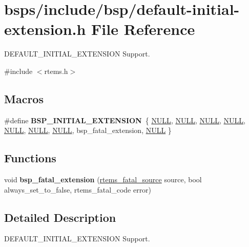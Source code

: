 \hypertarget{default-initial-extension_8h}{}\section{bsps/include/bsp/default-\/initial-\/extension.h File Reference}
\label{default-initial-extension_8h}


D\+E\+F\+A\+U\+L\+T\+\_\+\+I\+N\+I\+T\+I\+A\+L\+\_\+\+E\+X\+T\+E\+N\+S\+I\+ON Support.  


{\ttfamily \#include $<$rtems.\+h$>$}\newline
\subsection*{Macros}
\begin{DoxyCompactItemize}
\item 
\mbox{\label{default-initial-extension_8h_a56bfae5880e466e14ca27beaafc41443}} 
\#define {\bfseries B\+S\+P\+\_\+\+I\+N\+I\+T\+I\+A\+L\+\_\+\+E\+X\+T\+E\+N\+S\+I\+ON}~\{ \mbox{\hyperlink{bestcomm__api_8h_a872bb74de61c3689ccd5b41873fce42c}{N\+U\+LL}}, \mbox{\hyperlink{bestcomm__api_8h_a872bb74de61c3689ccd5b41873fce42c}{N\+U\+LL}}, \mbox{\hyperlink{bestcomm__api_8h_a872bb74de61c3689ccd5b41873fce42c}{N\+U\+LL}}, \mbox{\hyperlink{bestcomm__api_8h_a872bb74de61c3689ccd5b41873fce42c}{N\+U\+LL}}, \mbox{\hyperlink{bestcomm__api_8h_a872bb74de61c3689ccd5b41873fce42c}{N\+U\+LL}}, \mbox{\hyperlink{bestcomm__api_8h_a872bb74de61c3689ccd5b41873fce42c}{N\+U\+LL}}, \mbox{\hyperlink{bestcomm__api_8h_a872bb74de61c3689ccd5b41873fce42c}{N\+U\+LL}}, bsp\+\_\+fatal\+\_\+extension, \mbox{\hyperlink{bestcomm__api_8h_a872bb74de61c3689ccd5b41873fce42c}{N\+U\+LL}} \}
\end{DoxyCompactItemize}
\subsection*{Functions}
\begin{DoxyCompactItemize}
\item 
\mbox{\label{default-initial-extension_8h_af41429877e77754fc4a5311025119db7}} 
void {\bfseries bsp\+\_\+fatal\+\_\+extension} (\mbox{\hyperlink{group__RTEMSScoreIntErr_ga878b4de77df7d0b83d19609d4de42c26}{rtems\+\_\+fatal\+\_\+source}} source, bool always\+\_\+set\+\_\+to\+\_\+false, rtems\+\_\+fatal\+\_\+code error)
\end{DoxyCompactItemize}


\subsection{Detailed Description}
D\+E\+F\+A\+U\+L\+T\+\_\+\+I\+N\+I\+T\+I\+A\+L\+\_\+\+E\+X\+T\+E\+N\+S\+I\+ON Support. 

